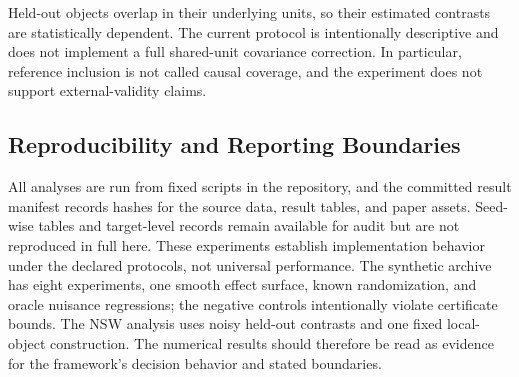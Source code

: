 \documentclass[11pt]{article}
\numberwithin{equation}{section}
\newcommand{\1}{\mathbf 1}
\begin{document}
Held-out objects overlap in their underlying units, so their estimated contrasts are statistically dependent.  The current protocol is intentionally descriptive and does not implement a full shared-unit covariance correction.  In particular, reference inclusion is not called causal coverage, and the experiment does not support external-validity claims.


\subsection*{Reproducibility and Reporting Boundaries}
All analyses are run from fixed scripts in the repository, and the committed result manifest records hashes for the source data, result tables, and paper assets.  Seed-wise tables and target-level records remain available for audit but are not reproduced in full here.  These experiments establish implementation behavior under the declared protocols, not universal performance.  The synthetic archive has eight experiments, one smooth effect surface, known randomization, and oracle nuisance regressions; the negative controls intentionally violate certificate bounds.  The NSW analysis uses noisy held-out contrasts and one fixed local-object construction.  The numerical results should therefore be read as evidence for the framework's decision behavior and stated boundaries.
\end{document}
